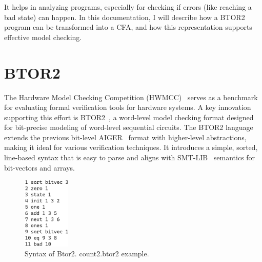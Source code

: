 It helps in analyzing programs, especially for checking if errors (like reaching a bad state) can happen. In this documentation, I will describe how a BTOR2 program can be transformed into a CFA, and how this representation supports effective model checking.

\section{ BTOR2 }



The Hardware Model Checking Competition (HWMCC)~\cite{hwmcc} serves as a benchmark for evaluating formal verification tools for hardware systems. A key innovation supporting this effort is BTOR2~\cite{btor2}, a word-level model checking format designed for bit-precise modeling of word-level sequential circuits.
The BTOR2 language extends the previous bit-level AIGER~\cite{AIGER} format with higher-level abstractions, making it ideal for various verification techniques. It introduces a simple, sorted, line-based syntax that is easy to parse and aligns with SMT-LIB~\cite{SMT-LIB} semantics for bit-vectors and arrays.


\begin{figure}
  \centering
  \includegraphics[width=0.2\textwidth]{figures/count2.png}
  \caption{ Syntax of Btor2. count2.btor2 example.  }
  \label{fig:count2}
\end{figure}

